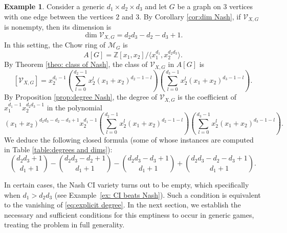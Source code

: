 \documentclass[11pt]{amsart}
\numberwithin{equation}{section}
\theoremstyle{plain}
\numberwithin{theorem}{section}
\theoremstyle{definition}
\newtheorem{example}[theorem]{Example}
\newcommand{\Z}{{\mathbb Z}}
\newcommand{\Mg}{{\mathcal M}_G}
\newcommand{\Vc}{{\mathcal V}_{X,G}}
\begin{document}
\begin{example}\label{example:Nash3play}
    Consider a generic $d_1 \times d_2 \times d_3$ and let $G$ be a graph on $3$ vertices with one edge between the vertices $2$ and $3$. By Corollary \ref{cor:dim Nash}, if $\Vc$ is nonempty, then its dimension is
    \[
\dim \Vc = d_2d_3-d_2-d_3+1.
    \]
    In this setting, the Chow ring of $\Mg$ is 
    \[A[G]=\Z[x_1,x_2]/\langle x_1^{d_1},x_2^{d_2d_3}\rangle .
    \]
    By Theorem \ref{theo: class of Nash}, the class of $\Vc$ in $A[G]$ is
    \[
    \left[ \Vc\right] = x_2^{d_1-1}\left(    
        \sum_{l=0}^{d_{2}-1} x_2^l\left(x_1+x_2\right)^{d_{2}-1-l}\right)
        \left(\sum_{l=0}^{d_{3}-1} x_2^l\left(x_1+x_2\right)^{d_{3}-1-l}\right).
    \]
    By Proposition \ref{prop:degree Nash}, the degree of $\Vc$ is the coefficient of $x_1^{d_1-1}x_2^{d_2d_3-1}$ in the polynomial 
    \[
        (x_1+x_2)^{d_2d_3-d_2-d_3+1}x_2^{d_1-1}\left(    
        \sum_{l=0}^{d_{2}-1} x_2^l\left(x_1+x_2\right)^{d_{2}-1-l}\right)
        \left(\sum_{l=0}^{d_{3}-1} x_2^l\left(x_1+x_2\right)^{d_{3}-1-l}\right).
    \]
   We deduce the following closed formula (some of whose instances are computed in Table \ref{table:degrees and dims}):
    \begin{equation}\label{eq:explicit degree}
    \binom{d_2d_3+1}{d_1+1}-\binom{d_2d_3-d_2+1}{d_1+1}-\binom{d_2d_3-d_3+1}{d_1+1}+\binom{d_2d_3-d_2-d_3+1}{d_1+1}.
    \end{equation}

\noindent In certain cases, the Nash CI variety turns out to be empty, which specifically when $d_1 > d_2 d_3$ (see Example~\ref{ex: CI beats Nash}). Such a condition is equivalent to the vanishing of \eqref{eq:explicit degree}.
In the next section, we establish the necessary and sufficient conditions for this emptiness to occur in generic games, treating the problem in full generality.


\end{example}
\end{document}
